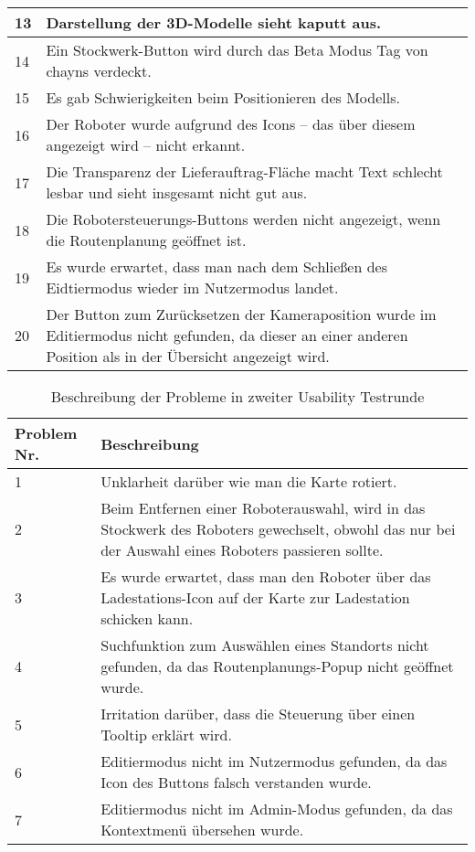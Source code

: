 \begin{table}[H]
\begin{tabular}{l|l}
        13          & \multicolumn{1}{p{12cm}}{Darstellung der 3D-Modelle sieht kaputt aus.} \\ \hline
        14          & \multicolumn{1}{p{12cm}}{Ein Stockwerk-Button wird durch das Beta Modus Tag von chayns verdeckt.} \\ \hline
        15          & \multicolumn{1}{p{12cm}}{Es gab Schwierigkeiten beim Positionieren des Modells.} \\ \hline
        16          & \multicolumn{1}{p{12cm}}{Der Roboter wurde aufgrund des Icons – das über diesem angezeigt wird – nicht erkannt.} \\ \hline
        17          & \multicolumn{1}{p{12cm}}{Die Transparenz der Lieferauftrag-Fläche macht Text schlecht lesbar und sieht insgesamt nicht gut aus.} \\ \hline
        18          & \multicolumn{1}{p{12cm}}{Die Robotersteuerungs-Buttons werden nicht angezeigt, wenn die Routenplanung geöffnet ist.} \\ \hline
        19          & \multicolumn{1}{p{12cm}}{Es wurde erwartet, dass man nach dem Schließen des Eidtiermodus wieder im Nutzermodus landet.} \\ \hline
        20          & \multicolumn{1}{p{12cm}}{Der Button zum Zurücksetzen der Kameraposition wurde im Editiermodus nicht gefunden, da dieser an einer anderen Position als in der Übersicht angezeigt wird.} \\
    \end{tabular}
\end{table}
\begin{table}[H]
    \caption{Beschreibung der Probleme in zweiter Usability Testrunde}\label{tbl:2ndUsabilityTestsProblemsDesc}
    \begin{tabular}{l|l}
        Problem Nr. & Beschreibung \\ \hline
        1           & \multicolumn{1}{p{12cm}}{Unklarheit darüber wie man die Karte rotiert.} \\ \hline
        2           & \multicolumn{1}{p{12cm}}{Beim Entfernen einer Roboterauswahl, wird in das Stockwerk des Roboters gewechselt, obwohl das nur bei der Auswahl eines Roboters passieren sollte.} \\ \hline
        3           & \multicolumn{1}{p{12cm}}{Es wurde erwartet, dass man den Roboter über das Ladestations-Icon auf der Karte zur Ladestation schicken kann.} \\ \hline
        4           & \multicolumn{1}{p{12cm}}{Suchfunktion zum Auswählen eines Standorts nicht gefunden, da das Routenplanungs-Popup nicht geöffnet wurde.} \\ \hline
        5           & \multicolumn{1}{p{12cm}}{Irritation darüber, dass die Steuerung über einen Tooltip erklärt wird.} \\ \hline
        6           & \multicolumn{1}{p{12cm}}{Editiermodus nicht im Nutzermodus gefunden, da das Icon des Buttons falsch verstanden wurde.} \\ \hline
        7           & \multicolumn{1}{p{12cm}}{Editiermodus nicht im Admin-Modus gefunden, da das Kontextmenü übersehen wurde.}
    \end{tabular}
\end{table}
